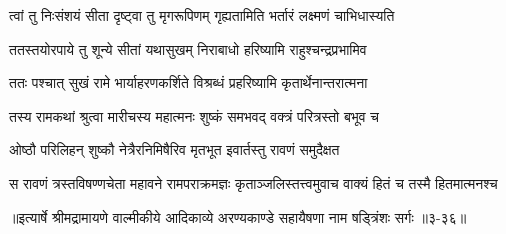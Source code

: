 \twolineshloka
{त्वां तु निःसंशयं सीता दृष्ट्वा तु मृगरूपिणम्}
{गृह्यतामिति भर्तारं लक्ष्मणं चाभिधास्यति} %

\twolineshloka
{ततस्तयोरपाये तु शून्ये सीतां यथासुखम्}
{निराबाधो हरिष्यामि राहुश्चन्द्रप्रभामिव} %

\twolineshloka
{ततः पश्चात् सुखं रामे भार्याहरणकर्शिते}
{विश्रब्धं प्रहरिष्यामि कृतार्थेनान्तरात्मना} %

\twolineshloka
{तस्य रामकथां श्रुत्वा मारीचस्य महात्मनः}
{शुष्कं समभवद् वक्त्रं परित्रस्तो बभूव च} %

\twolineshloka
{ओष्ठौ परिलिहन् शुष्कौ नेत्रैरनिमिषैरिव}
{मृतभूत इवार्तस्तु रावणं समुदैक्षत} %

\twolineshloka
{स रावणं त्रस्तविषण्णचेता महावने रामपराक्रमज्ञः}
{कृताञ्जलिस्तत्त्वमुवाच वाक्यं हितं च तस्मै हितमात्मनश्च} %


॥इत्यार्षे श्रीमद्रामायणे वाल्मीकीये आदिकाव्ये अरण्यकाण्डे सहायैषणा नाम षड्त्रिंशः सर्गः ॥३-३६॥
